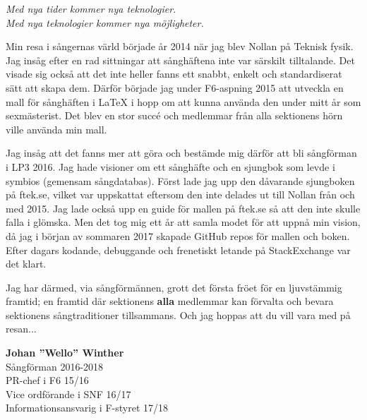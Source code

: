 {\large
\setlength{\parskip}{0.8em}
\textit{Med nya tider kommer nya teknologier.}\\
\textit{Med nya teknologier kommer nya möjligheter.}

Min resa i sångernas värld började år 2014 när jag blev Nollan på Teknisk fysik. Jag insåg efter en rad sittningar att sånghäftena inte var särskilt tilltalande. Det visade sig också att det inte heller fanns ett snabbt, enkelt och standardiserat sätt att skapa dem.
Därför började jag under F6-aspning 2015 att utveckla en mall för sånghäften i LaTeX i hopp om att kunna använda den under mitt år som sexmästerist.
Det blev en stor succé och medlemmar från alla sektionens hörn ville använda min mall.

Jag insåg att det fanns mer att göra och bestämde mig därför att bli sångförman i LP3 2016.
Jag hade visioner om ett sånghäfte och en sjungbok som levde i symbios (gemensam sångdatabas).
Först lade jag upp den dåvarande sjungboken på ftek.se, vilket var uppskattat eftersom den inte delades ut till Nollan från och med 2015.
Jag lade också upp en guide för mallen på ftek.se så att den inte skulle falla i glömska.
Men det tog mig ett år att samla modet för att uppnå min vision, då jag i början av sommaren 2017 skapade GitHub repos för mallen och boken.
Efter dagars kodande, debuggande och frenetiskt letande på StackExchange var det klart.

Jag har därmed, via sångförmännen, grott det första fröet för en ljuvstämmig framtid; en framtid där sektionens \textbf{alla} medlemmar kan förvalta och bevara sektionens sångtraditioner tillsammans. Och jag hoppas att du vill vara med på resan...

\begin{flushright}
\textbf{Johan ''Wello'' Winther}\\
Sångförman 2016-2018\\
PR-chef i F6 15/16\\
Vice ordförande i SNF 16/17\\
Informationsansvarig i F-styret 17/18\\
\end{flushright}
}

